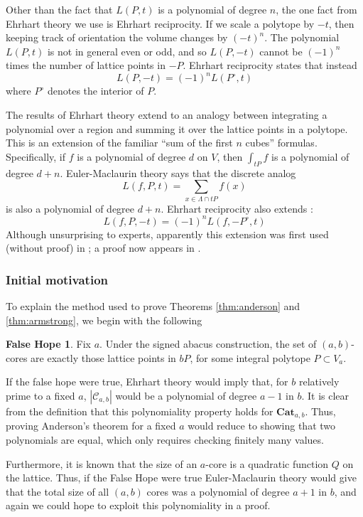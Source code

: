 \documentclass{amsart}[12pt]
\theoremstyle{definition}
\newtheorem*{FalseHope}{False Hope}
\newcommand{\Cat}{\mathbf{Cat}}
\begin{document}
Other than the fact that $L(P,t)$ is a polynomial of degree $n$, the one fact from Ehrhart theory we use is Ehrhart reciprocity. If we scale a polytope by $-t$, then keeping track of orientation the volume changes by $(-t)^n$. The polynomial $L(P,t)$ is not in general even or odd, and so $L(P,-t)$ cannot be $(-1)^n$ times the number of lattice points in $-P$. Ehrhart reciprocity states that instead 
$$L(P,-t)=(-1)^nL(P^\circ, t)$$
 where $P^\circ$ denotes the interior of $P$.




The results of Ehrhart theory extend to an analogy between integrating a polynomial over a region and summing it over the lattice points in a polytope. This is an extension of the familiar ``sum of the first $n$ cubes'' formulas.  Specifically, if $f$ is a polynomial of degree $d$ on $V$, then $\int_{tP} f$ is a polynomial of degree $d+n$. Euler-Maclaurin theory says that the discrete analog
$$L(f, P, t)=\sum_{x\in\Lambda\cap tP} f(x)$$
is also a polynomial of degree $d+ n$. Ehrhart reciprocity also extends : $$L(f,P,-t)=(-1)^nL(f, -P^\circ, t)$$
Although unsurprising to experts, apparently this extension was first used (without proof) in \cite{CJM}; a proof now appears in \cite{AB}.






\subsubsection{Initial motivation}
To explain the method used to prove Theorems \ref{thm:anderson} and \ref{thm:armstrong}, we begin with the following


\begin{FalseHope}
Fix $a$. Under the signed abacus construction, the set of $(a,b)$-cores are exactly those lattice points in $bP$, for some integral polytope $P\subset V_a$.
\end{FalseHope}



If the false hope were true, Ehrhart theory would imply that, for $b$ relatively prime to a fixed $a$, $|\mathcal{C}_{a,b}|$ would be a polynomial of degree $a-1$ in $b$. It is clear from the definition that this polynomiality property holds for $\Cat_{a,b}$. Thus, proving Anderson's theorem for a fixed $a$ would reduce to showing that two polynomials are equal, which only requires checking finitely many values.

Furthermore, it is known that the size of an $a$-core is a quadratic function $Q$ on the lattice. Thus, if the False Hope were true Euler-Maclaurin theory would give that the total size of all $(a,b)$ cores was a polynomial of degree $a+1$ in $b$, and again we could hope to exploit this polynomiality in a proof.
\end{document}
